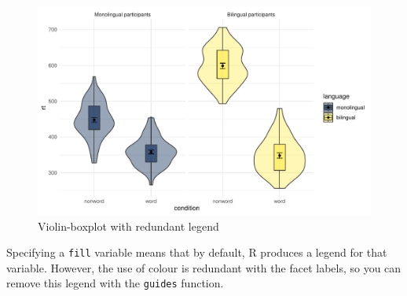 \documentclass[
  english,
  doc,floatsintext]{apa6}
\begin{document}
\begin{figure}

{\centering \includegraphics[width=1\linewidth]{images/unnamed-chunk-22-1} 

}

\caption{Violin-boxplot with redundant legend}\label{fig:unnamed-chunk-22}
\end{figure}

Specifying a \texttt{fill} variable means that by default, R produces a legend for that variable. However, the use of colour is redundant with the facet labels, so you can remove this legend with the \texttt{guides} function.
\end{document}
